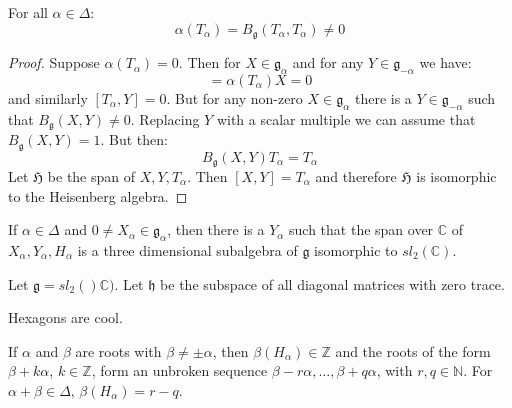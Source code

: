 \documentclass[crop=false,class=article]{standalone}                           %
\begin{document}
        \begin{theorem}
            For all $\alpha\in\Delta$:
            \begin{equation}
                \alpha(T_{\alpha})
                =B_{\mathfrak{g}}(T_{\alpha},T_{\alpha})\ne{0}
            \end{equation}
        \end{theorem}
        \begin{proof}
            Suppose $\alpha(T_{\alpha})=0$. Then for $X\in\mathfrak{g}_{\alpha}$
            and for any $Y\in\mathfrak{g}_{\minus\alpha}$ we have:
            \begin{equation}
                [T_{\alpha},X]=\alpha(T_{\alpha})X=0
            \end{equation}
            and similarly $[T_{\alpha},Y]=0$. But for any non-zero
            $X\in\mathfrak{g}_{\alpha}$ there is a
            $Y\in\mathfrak{g}_{\minus\alpha}$ such that
            $B_{\mathfrak{g}}(X,Y)\ne{0}$. Replacing $Y$ with a scalar multiple
            we can assume that $B_{\mathfrak{g}}(X,Y)=1$. But then:
            \begin{equation}
                B_{\mathfrak{g}}(X,Y)T_{\alpha}=T_{\alpha}
            \end{equation}
            Let $\mathfrak{H}$ be the span of $X,Y,T_{\alpha}$. Then
            $[X,Y]=T_{\alpha}$ and therefore $\mathfrak{H}$ is isomorphic to the
            Heisenberg algebra.
        \end{proof}
        \begin{theorem}
            If $\alpha\in\Delta$ and $0\ne{X}_{\alpha}\in\mathfrak{g}_{\alpha}$,
            then there is a $Y_{\alpha}$ such that the span over $\mathbb{C}$ of
            $X_{\alpha},Y_{\alpha},H_{\alpha}$ is a three dimensional subalgebra
            of $\mathfrak{g}$ isomorphic to $sl_{2}(\mathbb{C})$.
        \end{theorem}
        \begin{example}
            Let $\mathfrak{g}=sl_{2}()\mathbb{C})$. Let $\mathfrak{h}$ be the
            subspace of all diagonal matrices with zero trace.
        \end{example}
        \begin{example}
            Hexagons are cool.
        \end{example}
        \begin{theorem}
            If $\alpha$ and $\beta$ are roots with $\beta\ne\pm\alpha$, then
            $\beta(H_{\alpha})\in\mathbb{Z}$ and the roots of the form
            $\beta+k\alpha$, $k\in\mathbb{Z}$, form an unbroken sequence
            $\beta-r\alpha,\dots,\beta+q\alpha$, with $r,q\in\mathbb{N}$. For
            $\alpha+\beta\in\Delta$, $\beta(H_{\alpha})=r-q$.
        \end{theorem}
\end{document}
